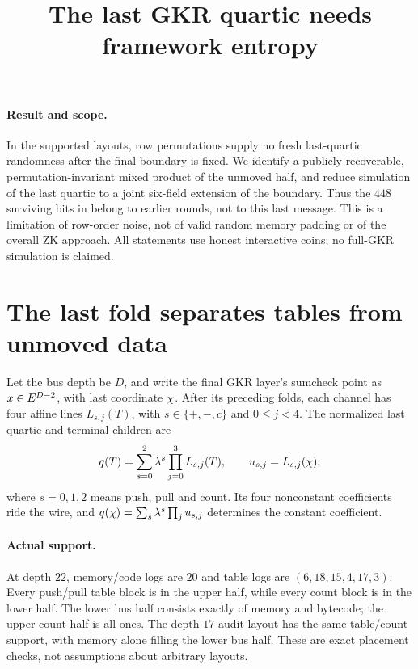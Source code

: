 \documentclass[11pt]{article}
\title{The last GKR quartic needs framework entropy}
\author{}
\date{}
\begin{document}
\maketitle
\vspace{-2em}

\paragraph{Result and scope.} In the supported layouts, row permutations supply no fresh last-quartic randomness after the final boundary is fixed. We identify a publicly recoverable, permutation-invariant mixed product of the unmoved half, and reduce simulation of the last quartic to a joint six-field extension of the boundary. Thus the $448$ surviving bits in  belong to earlier rounds, not to this last message. This is a limitation of row-order noise, not of valid random memory padding or of the overall ZK approach. All statements use honest interactive coins; no full-GKR simulation is claimed.

\section{The last fold separates tables from unmoved data}

Let the bus depth be $D$, and write the final GKR layer's sumcheck point as $x\in E^{D-2}$, with last coordinate $\chi$. After its preceding folds, each channel has four affine lines $L_{s,j}(T)$, with $s\in\{+,-,c\}$ and $0\le j<4$. The normalized last quartic and terminal children are
\[
 q(T)=\sum_{s=0}^2\lambda^s\prod_{j=0}^3 L_{s,j}(T),
 \qquad u_{s,j}=L_{s,j}(\chi),
\]
where $s=0,1,2$ means push, pull and count. Its four nonconstant coefficients ride the wire, and $q(\chi)=\sum_s\lambda^s\prod_j u_{s,j}$ determines the constant coefficient.

\paragraph{Actual support.} At depth $22$, memory/code logs are $20$ and table logs are $(6,18,15,4,17,3)$. Every push/pull table block is in the upper half, while every count block is in the lower half. The lower bus half consists exactly of memory and bytecode; the upper count half is all ones. The depth-$17$ audit layout has the same table/count support, with memory alone filling the lower bus half. These are exact placement checks, not assumptions about arbitrary layouts.
\end{document}
